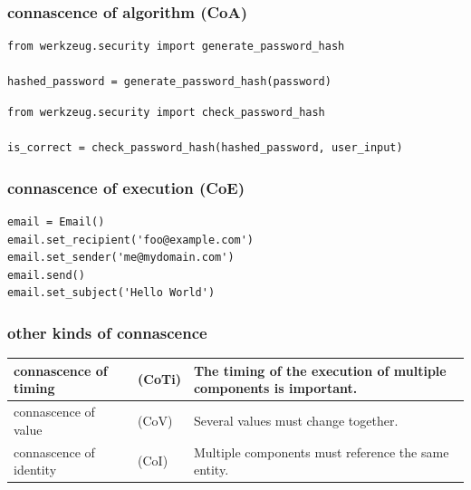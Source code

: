 \documentclass[aspectratio=169,12pt,xcolor=dvipsnames]{beamer}
\begin{document}
\begin{frame}[fragile]
  \frametitle{connascence of algorithm (CoA)}
  \begin{center}
    \begin{minipage}[c]{.98\textwidth}
      \begin{verbatim}
from werkzeug.security import generate_password_hash

hashed_password = generate_password_hash(password)
      \end{verbatim}
    \end{minipage}
    \begin{minipage}[c]{.98\textwidth}
      \begin{verbatim}
from werkzeug.security import check_password_hash

is_correct = check_password_hash(hashed_password, user_input)
      \end{verbatim}
    \end{minipage}
  \end{center}
\end{frame}

\begin{frame}[fragile]
  \frametitle{connascence of execution (CoE)}
  \begin{center}
    \begin{minipage}[c]{.6\textwidth}
      \begin{verbatim}
email = Email()
email.set_recipient('foo@example.com')
email.set_sender('me@mydomain.com')
email.send()
email.set_subject('Hello World')
      \end{verbatim}
    \end{minipage}
  \end{center}
\end{frame}

\begin{frame}
  \frametitle{other kinds of connascence}
  \begin{center}
    \begin{tabular}{|ll|p{}|}\hline
      connascence of timing   & (CoTi) & The timing of the execution of multiple components is important.\\\hline
      connascence of value    & (CoV)  & Several values must change together.\\\hline
      connascence of identity & (CoI)  & Multiple components must reference the same entity.\\\hline
    \end{tabular}
  \end{center}
\end{frame}


\end{document}
